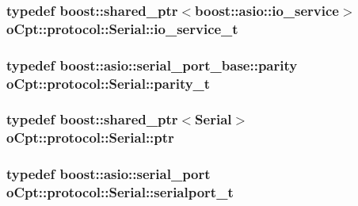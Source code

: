\subsubsection[{\texorpdfstring{io\+\_\+service\+\_\+t}{io_service_t}}]{\setlength{\rightskip}{0pt plus 5cm}typedef boost\+::shared\+\_\+ptr$<$boost\+::asio\+::io\+\_\+service$>$ {\bf o\+Cpt\+::protocol\+::\+Serial\+::io\+\_\+service\+\_\+t}}\hypertarget{classo_cpt_1_1protocol_1_1_serial_ac9305799ef4be4eb50f1274184492f04}{}\label{classo_cpt_1_1protocol_1_1_serial_ac9305799ef4be4eb50f1274184492f04}
\subsubsection[{\texorpdfstring{parity\+\_\+t}{parity_t}}]{\setlength{\rightskip}{0pt plus 5cm}typedef boost\+::asio\+::serial\+\_\+port\+\_\+base\+::parity {\bf o\+Cpt\+::protocol\+::\+Serial\+::parity\+\_\+t}}\hypertarget{classo_cpt_1_1protocol_1_1_serial_aae21a39fe2f321475ca19d46bf40d5f3}{}\label{classo_cpt_1_1protocol_1_1_serial_aae21a39fe2f321475ca19d46bf40d5f3}
\subsubsection[{\texorpdfstring{ptr}{ptr}}]{\setlength{\rightskip}{0pt plus 5cm}typedef boost\+::shared\+\_\+ptr$<${\bf Serial}$>$ {\bf o\+Cpt\+::protocol\+::\+Serial\+::ptr}}\hypertarget{classo_cpt_1_1protocol_1_1_serial_a4c97c6a2456d649974e07a186f634780}{}\label{classo_cpt_1_1protocol_1_1_serial_a4c97c6a2456d649974e07a186f634780}
\subsubsection[{\texorpdfstring{serialport\+\_\+t}{serialport_t}}]{\setlength{\rightskip}{0pt plus 5cm}typedef boost\+::asio\+::serial\+\_\+port {\bf o\+Cpt\+::protocol\+::\+Serial\+::serialport\+\_\+t}}\hypertarget{classo_cpt_1_1protocol_1_1_serial_a3949fae08041279672bcb29b94d4cd52}{}\label{classo_cpt_1_1protocol_1_1_serial_a3949fae08041279672bcb29b94d4cd52}
